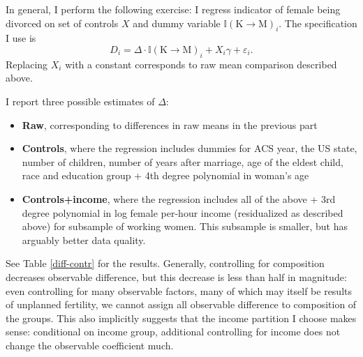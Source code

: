 \documentclass[12pt,letter]{article}
\newcommand{\I}{\mathbb{I}}
\begin{document}
In general, I perform the following exercise: I regress indicator of female being divorced on set of controls $X$ and dummy variable $\I(\text{K$\to$M})_i$. The specification I use is
\[D_i = \Delta \cdot \I(\text{K$\to$M})_i + X_i\gamma + \varepsilon_i.\]
Replacing $X_i$ with a constant corresponds to raw mean comparison described above. 

I report three possible estimates of $\Delta$:
\begin{itemize}
\item \textbf{Raw}, corresponding to differences in raw means in the previous part
\item \textbf{Controls}, where the regression includes dummies for ACS year, the US state, number of children, number of years after marriage, age of the eldest child, race and education group + 4th degree polynomial in woman's age
\item \textbf{Controls+income}, where the regression includes all of the above + 3rd degree polynomial in log female per-hour income (residualized as described above) for subsample of working women. This subsample is smaller, but has arguably better data quality.
\end{itemize}

See Table \ref{diff-contr} for the results. Generally, controlling for composition decreases observable difference, but this decrease is less than half in magnitude: even controlling for many observable factors, many of which may itself be results of unplanned fertility, we cannot assign all observable difference to composition of the groups. This also implicitly suggests that the income partition I choose makes sense: conditional on income group, additional controlling for income does not change the observable coefficient much. 
\end{document}
